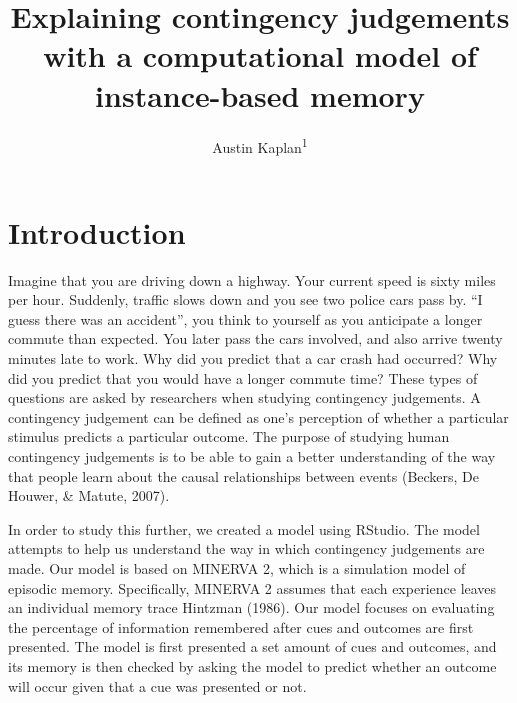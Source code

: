 \documentclass[
  english,
  man,floatsintext]{apa6}
\title{Explaining contingency judgements with a computational model of instance-based memory}
\author{Austin Kaplan\textsuperscript{1}}
\date{}
\affiliation{\vspace{0.5cm}\textsuperscript{1} Brooklyn College}
\begin{document}
\maketitle

\hypertarget{introduction}{%
\section{Introduction}\label{introduction}}

Imagine that you are driving down a highway. Your current speed is sixty miles per hour. Suddenly, traffic slows down and you see two police cars pass by. \enquote{I guess there was an accident}, you think to yourself as you anticipate a longer commute than expected. You later pass the cars involved, and also arrive twenty minutes late to work. Why did you predict that a car crash had occurred? Why did you predict that you would have a longer commute time? These types of questions are asked by researchers when studying contingency judgements. A contingency judgement can be defined as one's perception of whether a particular stimulus predicts a particular outcome. The purpose of studying human contingency judgements is to be able to gain a better understanding of the way that people learn about the causal relationships between events (Beckers, De Houwer, \& Matute, 2007).

In order to study this further, we created a model using RStudio. The model attempts to help us understand the way in which contingency judgements are made. Our model is based on MINERVA 2, which is a simulation model of episodic memory. Specifically, MINERVA 2 assumes that each experience leaves an individual memory trace Hintzman (1986). Our model focuses on evaluating the percentage of information remembered after cues and outcomes are first presented. The model is first presented a set amount of cues and outcomes, and its memory is then checked by asking the model to predict whether an outcome will occur given that a cue was presented or not.
\end{document}
